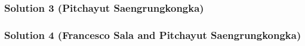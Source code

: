 \subsubsection{Solution 3 (Pitchayut Saengrungkongka)}
\begin{enumerate}
\end{enumerate}
\subsubsection{Solution 4 (Francesco Sala and Pitchayut Saengrungkongka)}
\begin{enumerate}
        \begin{enumerate}
        \end{enumerate}
\end{enumerate}
